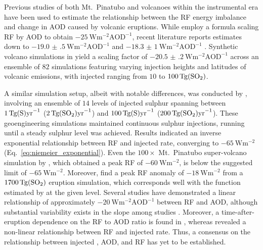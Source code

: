 \documentclass[draft]{agujournal2019}
\newcommand{\iso}[1][i]{{#1}njected \ce{SO2}}
\begin{document}
Previous studies of both Mt.\ Pinatubo \cite{mills2017,hansen2005} and volcanoes within
the instrumental era \cite{gregory2016} have been used to estimate the relationship
between the RF energy imbalance and change in AOD caused by volcanic eruptions. While
 employ a formula scaling RF by AOD to obtain
\(\SI{-25}{\watt\metre^{-2}\mathrm{AOD}^{-1}}\), recent literature reports estimates
down to \(\SI{-19.0(5)}{\watt\metre^{-2}\mathrm{AOD}^{-1}}\) \cite{gregory2016} and
\(\SI{-18.3(10)}{\watt\metre^{-2}\mathrm{AOD}^{-1}}\) \cite{mills2017}. Synthetic
volcano simulations in  yield a scaling factor of
\(\SI{-20.5(2)}{\watt\metre^{-2}\mathrm{AOD}^{-1}}\) across an ensemble of \(82\)
simulations featuring varying injection heights and latitudes of volcanic emissions,
with \iso{} ranging from \(10\) to \(\SI{100}{\tera\gram(\ce{SO2})}\).

A similar simulation setup, albeit with notable differences, was conducted by
, involving an ensemble of \(14\) levels of injected sulphur
spanning between \(\SI{1}{\tera\gram(\ce{S})\mathrm{yr}^{-1}}\)
(\(\SI{2}{\tera\gram(\ce{SO2})\mathrm{yr}^{-1}}\)) and
\(\SI{100}{\tera\gram(\ce{S})\mathrm{yr}^{-1}}\)
(\(\SI{200}{\tera\gram(\ce{SO2})\mathrm{yr}^{-1}}\)). These geoengineering simulations
maintained continuous sulphur injections, running until a steady sulphur level was
achieved. Results indicated an inverse exponential relationship between RF and \iso{}
rate, converging to \(\SI{-65}{\watt\metre^{-2}}\) (Eq.~\ref{eq:niemeier_exponential}).
Even the \(100\times\) Mt.\ Pinatubo super-volcano simulation by ,
which obtained a peak RF of \(\SI{-60}{\watt\metre^{-2}}\), is below the suggested limit
of \(\SI{-65}{\watt\metre^{-2}}\). Moreover,  find a peak RF anomaly
of \(\SI{-18}{\watt\metre^{-2}}\) from a \(\SI{1700}{\tera\gram(\ce{SO2})}\) eruption
simulation, which corresponds well with the function estimated by 
at the given  level. Several studies have demonstrated a linear relationship of
approximately \(-\SI{20}{\watt\metre^{-2}\mathrm{AOD}^{-1}}\) between RF and AOD,
although substantial variability exists in the slope among studies
\cite{mills2017,hansen2005,gregory2016,marshall2020,pitari2016b}. Moreover, a
time-after-eruption dependence on the RF to AOD ratio is found in ,
whereas  revealed a non-linear relationship between RF and \iso{}
rate. Thus, a consensus on the relationship between \iso{}, AOD, and RF has yet to be
established.
\end{document}
